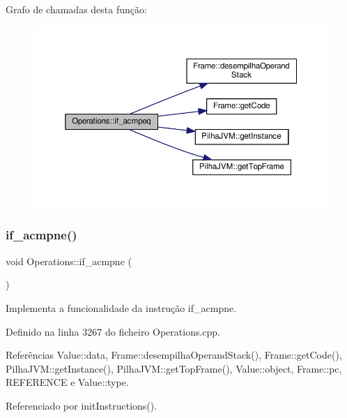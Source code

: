 Grafo de chamadas desta função\+:
\nopagebreak
\begin{figure}[H]
\begin{center}
\leavevmode
\includegraphics[width=350pt]{classOperations_aa0432645b0d0effb4d4d839ea2dcec1c_cgraph}
\end{center}
\end{figure}
\mbox{\label{classOperations_a7f43bbfba9b2feb66b695d24c43dc430}} 
\subsubsection{\texorpdfstring{if\+\_\+acmpne()}{if\_acmpne()}}
{\footnotesize\ttfamily void Operations\+::if\+\_\+acmpne (\begin{DoxyParamCaption}{ }\end{DoxyParamCaption})\hspace{0.3cm}{\ttfamily [private]}}



Implementa a funcionalidade da instrução if\+\_\+acmpne. 



Definido na linha 3267 do ficheiro Operations.\+cpp.



Referências Value\+::data, Frame\+::desempilha\+Operand\+Stack(), Frame\+::get\+Code(), Pilha\+J\+V\+M\+::get\+Instance(), Pilha\+J\+V\+M\+::get\+Top\+Frame(), Value\+::object, Frame\+::pc, R\+E\+F\+E\+R\+E\+N\+CE e Value\+::type.



Referenciado por init\+Instructions().

